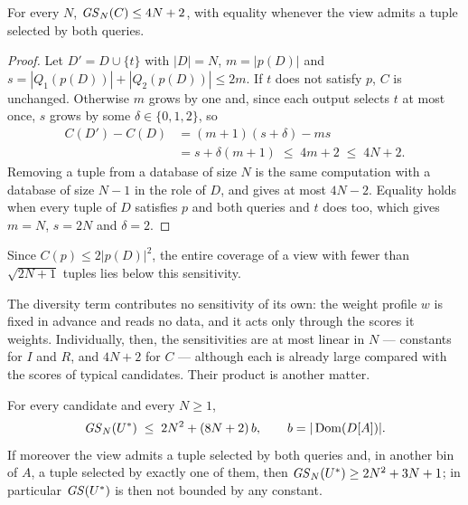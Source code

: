 \begin{lemma}[Coverage]
\label{lem:ideal-coverage}
For every $N$, $\mathit{GS}_N(C)\le4N+2$, with equality whenever the view admits a tuple selected by both queries.
\end{lemma}

\begin{proof}
Let $D'=D\cup\{t\}$ with $|D|=N$, $m=|p(D)|$ and $s=|Q_1(p(D))|+|Q_2(p(D))|\le2m$.
If $t$ does not satisfy $p$, $C$ is unchanged.
Otherwise $m$ grows by one and, since each output selects $t$ at most once, $s$ grows by some $\delta\in\{0,1,2\}$, so
\begin{align*}
C(D')-C(D)&=(m+1)(s+\delta)-ms\\
&=s+\delta(m+1)\;\le\;4m+2\;\le\;4N+2 .
\end{align*}
Removing a tuple from a database of size $N$ is the same computation with a database of size $N-1$ in the role of $D$, and gives at most $4N-2$.
Equality holds when every tuple of $D$ satisfies $p$ and both queries and $t$ does too, which gives $m=N$, $s=2N$ and $\delta=2$.
\end{proof}

Since $C(p)\le2|p(D)|^2$, the entire coverage of a view with fewer than $\sqrt{2N+1}$ tuples lies below this sensitivity.

The diversity term contributes no sensitivity of its own: the weight profile $w$ is fixed in advance and reads no data, and it acts only through the scores it weights.
Individually, then, the sensitivities are at most linear in $N$ --- constants for $I$ and $R$, and $4N+2$ for $C$ --- although each is already large compared with the scores of typical candidates.
Their product is another matter.

\begin{proposition}
\label{prop:ideal-utility-sensitivity}
For every candidate and every $N\ge1$,
\[
\mathit{GS}_N(U^*)\;\le\;2N^2+(8N+2)\,b,\qquad b=|\operatorname{Dom}(D[A])|.
\]
If moreover the view admits a tuple selected by both queries and, in another bin of $A$, a tuple selected by exactly one of them, then $\mathit{GS}_N(U^*)\ge2N^2+3N+1$; in particular $\mathit{GS}(U^*)$ is then not bounded by any constant.
\end{proposition}

